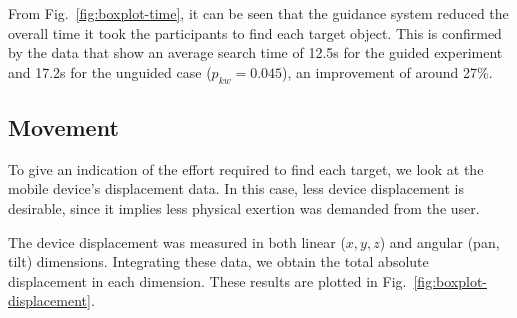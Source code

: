 \documentclass[runningheads]{llncs}
\newcommand\todo[1]{\textcolor{red}{#1}}
\begin{document}

From Fig.~\ref{fig:boxplot-time}, it can be seen that the guidance system reduced the overall time it took the participants to find each target object.
This is confirmed by the data that show an average search time of 12.5s for the guided experiment and 17.2s for the unguided case ($p_{kw}=0.045$), an improvement of around 27\%.

\subsection{Movement}

To give an indication of the effort required to find each target, we look at the mobile device's displacement data. 
In this case, less device displacement is desirable, since it implies less physical exertion was demanded from the user.%

The device displacement was measured in both linear ($x, y, z$) and angular (pan, tilt) dimensions.
Integrating these data, we obtain the total absolute displacement in each dimension.
These results are plotted in Fig.~\ref{fig:boxplot-displacement}.


\end{document}
